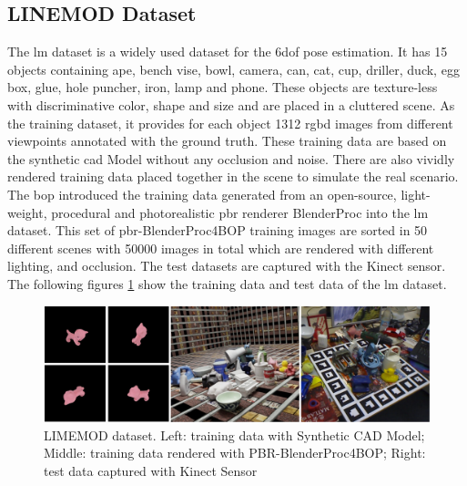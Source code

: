 \documentclass[12pt,DIV14,BCOR12mm,a4paper,footinclude=false,headinclude,parskip=half-,twoside,openright,cleardoublepage=empty,toc=index,bibliography=totoc,listof=totoc]{scrreprt}
\numberwithin{equation}{chapter}
\begin{document}
\subsection{LINEMOD Dataset}
The \gls{lm} dataset \cite{hinterstoisser2012model} is a widely used dataset for the \gls{6dof} pose estimation. It has 15 objects containing ape, bench vise, bowl, camera, can, cat, cup, driller, duck, egg box, glue, hole puncher, iron, lamp and phone. These objects are texture-less with discriminative color, shape and size and are placed in a cluttered scene. As the training dataset, it provides for each object 1312 \gls{rgbd} images from different viewpoints annotated with the ground truth. These training data are based on the synthetic \gls{cad} Model without any occlusion and noise. There are also vividly rendered training data placed together in the scene to simulate the real scenario. The \gls{bop} \cite{hodan2018bop}introduced the training data generated from an open-source, light-weight, procedural and photorealistic \gls{pbr} renderer BlenderProc \cite{denninger2019blenderproc}into the \gls{lm} dataset.
This set of \gls{pbr}-BlenderProc4BOP training images are sorted in 50 different scenes with 50000 images in total which are rendered with different lighting, and occlusion. The test datasets are captured with the Kinect sensor. The following figures \ref{img:linemod} show the training data and test data of the \gls{lm} dataset.
\begin{figure}[h]
  \centering
  \includegraphics[width=1.0\textwidth]{img/lm.pdf}
  \caption{LIMEMOD dataset. Left: training data with Synthetic CAD Model; Middle: training data rendered with PBR-BlenderProc4BOP; Right: test data captured with Kinect Sensor}
  \label{img:linemod}
\end{figure}
\end{document}
